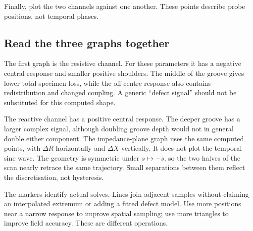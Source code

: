 Finally, plot the two channels against one another. These points describe probe positions, not temporal phases.
\begin{codeexample}[width=0pt]
\end{codeexample}

\subsection{Read the three graphs together}
The first graph is the resistive channel. For these parameters it has a
negative central response and smaller positive shoulders. The middle of the
groove gives lower total specimen loss, while the off-centre response also
contains redistribution and changed coupling. A generic ``defect signal''
should not be substituted for this computed shape.

The reactive channel has a positive central response. The deeper groove has
a larger complex signal, although doubling groove depth would not in general
double either component. The impedance-plane graph uses the same computed
points, with $\Delta R$ horizontally and $\Delta X$ vertically. It does not
plot the temporal sine wave. The geometry is symmetric under $s\mapsto-s$,
so the two halves of the scan nearly retrace the same trajectory. Small
separations between them reflect the discretisation, not hysteresis.

The markers identify actual solves. Lines join adjacent samples without
claiming an interpolated extremum or adding a fitted defect model. Use more
positions near a narrow response to improve spatial sampling; use more
triangles to improve field accuracy. These are different operations.

